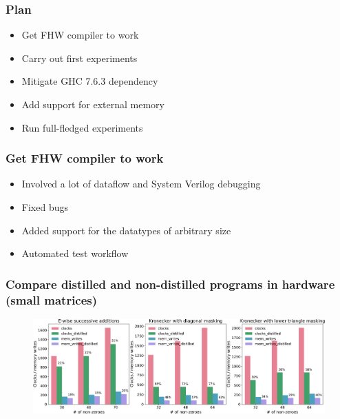\documentclass[xcolor=table]{beamer}
\begin{document}
\begin{frame}[fragile] \frametitle{Plan}

    \begin{itemize}
        \item Get FHW compiler to work
        \vfill
        \item Carry out first experiments
        \vfill
        \item Mitigate GHC 7.6.3 dependency
        \vfill
        \item Add support for external memory
        \vfill
        \item Run full-fledged experiments
    \end{itemize}
      
\end{frame}

\begin{frame}[fragile] \frametitle{Get FHW compiler to work}
  \begin{itemize}
      \item Involved a lot of dataflow and System Verilog debugging
      \vfill
      \item Fixed bugs
      \vfill
      \item Added support for the datatypes of arbitrary size
      \vfill
      \item Automated test workflow
  \end{itemize}
\end{frame}

\begin{frame}[fragile]\frametitle{Compare distilled and non-distilled programs in hardware (small matrices)}

\begin{figure}
    \centering
    \includegraphics[width=\textwidth]{pictures/HardwareBenchs.pdf}
    \label{fig:my_label}
\end{figure}

    
\end{frame}
\end{document}
